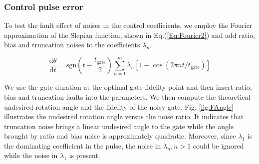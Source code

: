 \documentclass[conference, 9pt]{IEEEtran}
\begin{document}
\subsubsection{Control pulse error}
To test the fault effect of noises in the control coefficients, we employ the Fourier approximation of the Slepian function, shown in Eq.(\ref{Eq:Fourier2}) and add ratio, bias and truncation noises to the coefficients $\lambda_{n}$. 

\begin{equation}
	\frac{\text{d}\theta}{\text{d}t} = 
\mathrm{sgn}(t - \frac{t_{\text{gate}}}{2})\sum_{n = 1}^{m}\lambda_n[1-\cos(2\pi n t/t_{\text{gate}})]
\label{Eq:Fourier2}
\end{equation}

We use the gate duration at the optimal gate fidelity point and then insert ratio, bias and truncation faults into the parameters. We then compute the theoretical undesired rotation angle and the fidelity of the noisy gate. Fig. \ref{fig:FAngle} illustrates the undesired rotation angle versus the noise ratio. It indicates that truncation noise brings a linear undesired angle to the gate while the angle brought by ratio and bias noise is approximately quadratic. Moreover, since $\lambda_1$ is the dominating coefficient in the pulse, the noise in $\lambda_{n},n > 1$ could be ignored while the noise in $\lambda_1$ is present.
\end{document}
